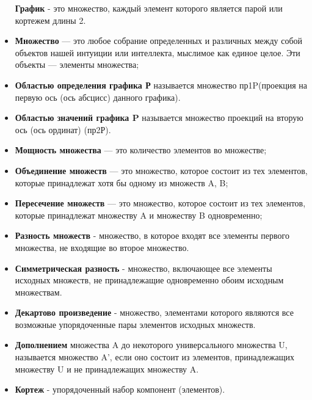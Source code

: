 \documentclass[a4paper,12pt]{extarticle}
\begin{document}
\begin{itemize}
\tem\textbf{График} - это множество, каждый элемент которого является парой или кортежем длины 2.\\
  \item\textbf{Множество} — это любое собрание определенных и различных между собой объектов нашей интуиции или интеллекта, мыслимое как единое целое. Эти объекты — элементы множества;\\
  \item\textbf{Областью определения графика Р} называется множество пр1P(проекция на первую ось (ось абсцисс) данного графика).\\
  \item\textbf{Областью значений графика P} называется множество проекций на вторую ось (ось ординат) (пр2Р).\\
  \item\textbf{Мощность множества} — это количество элементов во множестве;\\
  \item\textbf{Объединение множеств} — это множество, которое состоит из тех элементов, которые принадлежат хотя бы одному из множеств A, B;\\
  \item\textbf{Пересечение множеств} — это множество, которое состоит из тех элементов, которые  принадлежат множеству A и множеству B одновременно;\\
  \item\textbf{Разность множеств} - множество, в которое входят все элементы первого множества, не входящие во второе множество.\\
  \item\textbf{Симметрическая разность} - множество, включающее все элементы исходных множеств, не принадлежащие одновременно обоим исходным множествам.\\
  \item\textbf{Декартово произведение} - множество, элементами которого являются все возможные упорядоченные пары элементов исходных множеств.\\
  \item \textbf{Дополнением} множества A до некоторого универсального множества U, называется множество A’, если оно состоит из элементов, принадлежащих множеству U и не принадлежащих множеству A.\\
  \item \textbf{Кортеж} - упорядоченный набор компонент (элементов).\\
\end{itemize}
\end{document}
